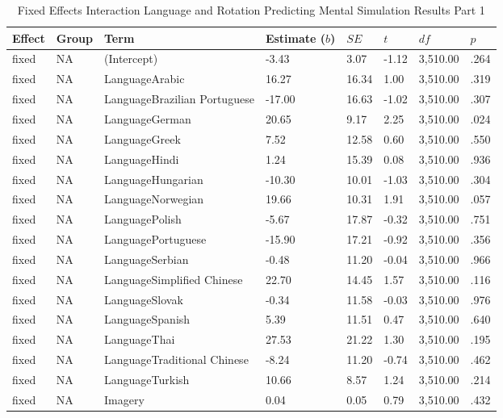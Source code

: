 \documentclass[
  man,floatsintext]{apa7}
\begin{document}
\begin{table}[tbp]

\begin{center}
\begin{threeparttable}

\caption{\label{tab:pred_interact}Fixed Effects Interaction Language and Rotation Predicting Mental Simulation Results Part 1}

\small{

\begin{tabular}{llllllll}
\toprule
Effect & Group & Term & Estimate ($b$) & $SE$ & $t$ & $df$ & $p$\\
\midrule
fixed & NA & (Intercept) & -3.43 & 3.07 & -1.12 & 3,510.00 & .264\\
fixed & NA & LanguageArabic & 16.27 & 16.34 & 1.00 & 3,510.00 & .319\\
fixed & NA & LanguageBrazilian Portuguese & -17.00 & 16.63 & -1.02 & 3,510.00 & .307\\
fixed & NA & LanguageGerman & 20.65 & 9.17 & 2.25 & 3,510.00 & .024\\
fixed & NA & LanguageGreek & 7.52 & 12.58 & 0.60 & 3,510.00 & .550\\
fixed & NA & LanguageHindi & 1.24 & 15.39 & 0.08 & 3,510.00 & .936\\
fixed & NA & LanguageHungarian & -10.30 & 10.01 & -1.03 & 3,510.00 & .304\\
fixed & NA & LanguageNorwegian & 19.66 & 10.31 & 1.91 & 3,510.00 & .057\\
fixed & NA & LanguagePolish & -5.67 & 17.87 & -0.32 & 3,510.00 & .751\\
fixed & NA & LanguagePortuguese & -15.90 & 17.21 & -0.92 & 3,510.00 & .356\\
fixed & NA & LanguageSerbian & -0.48 & 11.20 & -0.04 & 3,510.00 & .966\\
fixed & NA & LanguageSimplified Chinese & 22.70 & 14.45 & 1.57 & 3,510.00 & .116\\
fixed & NA & LanguageSlovak & -0.34 & 11.58 & -0.03 & 3,510.00 & .976\\
fixed & NA & LanguageSpanish & 5.39 & 11.51 & 0.47 & 3,510.00 & .640\\
fixed & NA & LanguageThai & 27.53 & 21.22 & 1.30 & 3,510.00 & .195\\
fixed & NA & LanguageTraditional Chinese & -8.24 & 11.20 & -0.74 & 3,510.00 & .462\\
fixed & NA & LanguageTurkish & 10.66 & 8.57 & 1.24 & 3,510.00 & .214\\
fixed & NA & Imagery & 0.04 & 0.05 & 0.79 & 3,510.00 & .432\\
\bottomrule
\end{tabular}

}

\end{threeparttable}
\end{center}

\end{table}
\end{document}
